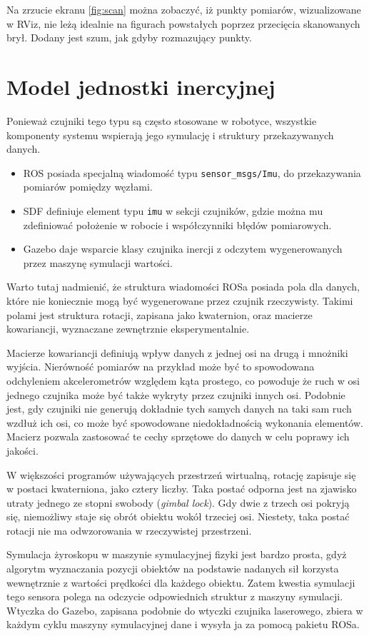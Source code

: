 			Na zrzucie ekranu \ref{fig:scan} można zobaczyć, iż punkty pomiarów, wizualizowane w RViz, nie leżą idealnie na figurach powstałych poprzez przecięcia skanowanych brył.
			Dodany jest szum, jak gdyby rozmazujący punkty.
		
\section{Model jednostki inercyjnej}
	Ponieważ czujniki tego typu są często stosowane w robotyce, wszystkie komponenty systemu wspierają jego symulację i struktury przekazywanych danych.
	\begin{itemize}
		\item ROS posiada specjalną wiadomość typu \texttt{sensor\_msgs/Imu}, do przekazywania pomiarów pomiędzy węzłami.
		\item SDF definiuje element typu \texttt{imu} w sekcji czujników, gdzie można mu zdefiniować położenie w robocie i współczynniki błędów pomiarowych.
		\item Gazebo daje wsparcie klasy czujnika inercji z odczytem wygenerowanych przez maszynę symulacji wartości.
	\end{itemize}
	
	Warto tutaj nadmienić, że struktura wiadomości ROSa posiada pola dla danych, które nie koniecznie mogą być wygenerowane przez czujnik rzeczywisty.
	Takimi polami jest struktura rotacji, zapisana jako kwaternion, oraz macierze kowariancji, wyznaczane zewnętrznie eksperymentalnie.
	
	Macierze kowariancji definiują wpływ danych z jednej osi na drugą i mnożniki wyjścia. 
	Nierówność pomiarów na przykład może być to spowodowana odchyleniem akcelerometrów względem kąta prostego, co powoduje że ruch w osi jednego czujnika może
	być także wykryty przez czujniki innych osi. 
	Podobnie jest, gdy czujniki nie generują dokładnie tych samych danych na taki sam ruch wzdłuż ich osi, co może być spowodowane niedokładnością wykonania elementów.
	Macierz pozwala zastosować te cechy sprzętowe do danych w celu poprawy ich jakości.
	
	W większości programów używających przestrzeń wirtualną, rotację zapisuje się w postaci kwaterniona, jako cztery liczby.
	Taka postać odporna jest na zjawisko utraty jednego ze stopni swobody (\emph{gimbal lock}). Gdy dwie z trzech osi pokryją się, niemożliwy staje się obrót obiektu wokół trzeciej osi. Niestety, taka postać rotacji nie ma odwzorowania w rzeczywistej przestrzeni.
	
	Symulacja żyroskopu w maszynie symulacyjnej fizyki jest bardzo prosta, gdyż algorytm wyznaczania pozycji obiektów na podstawie nadanych sił korzysta wewnętrznie z
	wartości prędkości dla każdego obiektu. Zatem kwestia symulacji tego sensora polega na odczycie odpowiednich struktur z maszyny symulacji.
	Wtyczka do Gazebo, zapisana podobnie do wtyczki czujnika laserowego, zbiera w każdym cyklu maszyny symulacyjnej dane i wysyła ja za pomocą pakietu ROSa.
	
